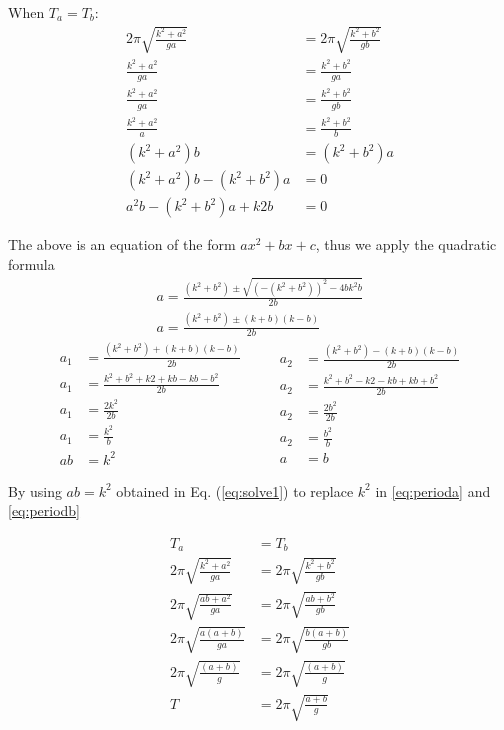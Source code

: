 \documentclass{report}
\begin{document}
When $T_a = T_b$:  
\begin{align*}
    2\pi \sqrt{\frac{k^2+a^2}{ga}}&=2\pi \sqrt{\frac{k^2+b^2}{gb}}\\
    \frac{k^2+a^2}{ ga }&= \frac{ k^2+b^2 }{ ga }\\
    \frac{ k^2+a^2 }{ ga }&= \frac{ k^2+b^2 }{ gb }\\
    \frac{ k^2+a^2 }{ a }&= \frac{ k^2+b^2 }{ b }\\
    (k^2+a^2)b &=(k^2+b^2)a \\
    (k^2+a^2)b-(k^2+b^2)a &= 0\\
    a^2b-(k^2+b^2)a + k2b &=0
\end{align*}

The above is an equation of the form $ax^2+bx+c$, thus we apply the quadratic formula
\begin{gather*}
    a= \frac{\left(k^2+b^2\right)\pm \sqrt{\left(-\left(k^2+b^2\right)\right)^2-4bk^2b}}{2b}\\
    a= \frac{\left(k^2+b^2\right)\pm \left(k+b\right)\left(k-b\right)}{ 2b }
\end{gather*}
\begin{equation}
    \begin{split}
        a_1 &= \frac{ (k^2+b^2)+ (k+b)(k-b) }{2b}\\
        a_1 &= \frac{ k^2+b^2+k2+kb-kb-b^2 }{2b} \\
        a_1 &= \frac{2k^2}{2b}\\
        a_1 &= \frac{k^2}{b}\\
        ab &= k^2 \label{eq:solve1} 
    \end{split}
    \qquad
    \begin{split}
        a_2 &= \frac{ (k^2+b^2)- (k+b)(k-b) }{ 2b } \\
        a_2 &= \frac{ k^2+b^2-k2-kb+kb+b^2 }{ 2b }   \\
        a_2 &= \frac{ 2b^2} { 2b }                    \\
        a_2 &= \frac{b^2}{ b }                      \\
        a &=b                          
    \end{split}
\end{equation}

By using $ab=k^2$ obtained in Eq. (\ref{eq:solve1}) to replace $k^2$ in \ref{eq:perioda} and \ref{eq:periodb} 

\begin{equation}
    \begin{aligned}
        T_a&=T_b \\
        2\pi \sqrt{\frac{k^2+a^2}{ga}} &=2\pi \sqrt{\frac{k^2+b^2}{gb}} \\
        2\pi \sqrt{\frac{ab+a^2}{ga}} &=2\pi \sqrt{\frac{ab+b^2}{gb}} \\
        2\pi \sqrt{\frac{a\left(a+b\right)}{ga}} &=2\pi \sqrt{\frac{b\left(a+b\right)}{gb}} \\
        2\pi \sqrt{\frac{\left(a+b\right)}{g}} &=2\pi \sqrt{\frac{\left(a+b\right)}{g}} \\
        T&=2\pi \sqrt{\frac{a+b}{ g }} \label{eq:periodab}
    \end{aligned}
\end{equation}
\end{document}
